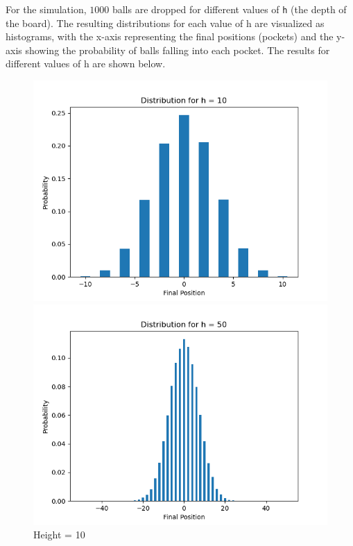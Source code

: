 \begin{solution}
	For the simulation, $1000$ balls are dropped for different values of \texttt{h} (the depth of the board). The resulting distributions for each value of h are visualized as histograms, with the x-axis representing the final positions (pockets) and the y-axis showing the probability of balls falling into each pocket. The results for different values of h are shown below.
	\begin{figure}[H]
		\centering
		\begin{minipage}{0.5\textwidth}
			\centering
			\includegraphics[width=\linewidth]{../images/2d1.png}
			\caption{Height = 10}
		\end{minipage}\hfill
		\begin{minipage}{0.5\textwidth}
			\centering
			\includegraphics[width=\linewidth]{../images/2d2.png}

\end{minipage}
\end{figure}
\end{solution}
